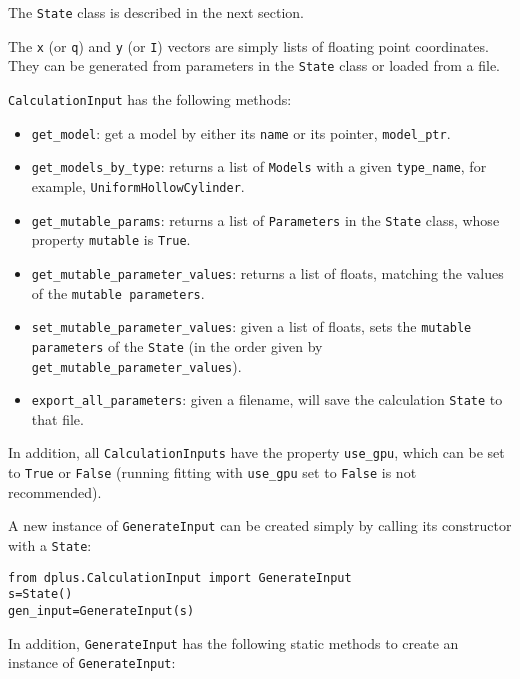 \documentclass[../D+Manual.tex]{subfiles}
\begin{document}
The \texttt{State} class is described in the next section.

The \texttt{x} (or \texttt{q}) and \texttt{y} (or \texttt{I}) vectors are simply lists of floating point coordinates. They
can be generated from parameters in the \texttt{State} class or loaded from a
file.

\texttt{CalculationInput} has the following methods:

\begin{itemize}
	\tightlist
	\item
	\texttt{get\_model}: get a model by either its \texttt{name} or its pointer,
	\texttt{model\_ptr}.
	\item
	\texttt{get\_models\_by\_type}: returns a list of \texttt{Models} with
	a given \texttt{type\_name}, for example, \texttt{UniformHollowCylinder}.
	\item
	\texttt{get\_mutable\_params}: returns a list of \texttt{Parameters}
	in the \texttt{State} class, whose property \texttt{mutable} is \texttt{True}.
	\item 
	\texttt{get\_mutable\_parameter\_values}: returns a list of floats, matching the values of the \texttt{mutable parameters}.
	\item
	\texttt{set\_mutable\_parameter\_values}: given a list of floats, sets the \texttt{mutable parameters} of the \texttt{State} (in the order given by 
	\texttt{get\_mutable\_parameter\_values}).
	\item
	\texttt{export\_all\_parameters}: given a filename, will save the calculation \texttt{State} to that file.
\end{itemize}


In addition, all \texttt{CalculationInputs} have the property \texttt{use\_gpu}, which can be set to \texttt{True} or \texttt{False} (running fitting with
\texttt{use\_gpu} set to \texttt{False} is not recommended).

A new instance of \texttt{GenerateInput} can be created simply by calling its constructor with a \texttt{State}:

\begin{lstlisting}[style=pythonstyle]
from dplus.CalculationInput import GenerateInput
s=State()
gen_input=GenerateInput(s)
\end{lstlisting}


In addition, \texttt{GenerateInput} has the following static methods to create an instance of
\texttt{GenerateInput}:
\end{document}
